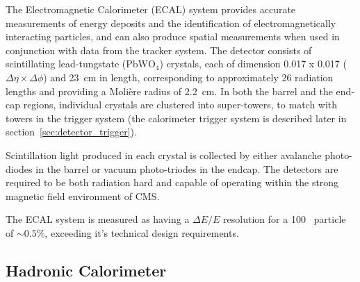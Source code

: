 

The Electromagnetic Calorimeter (ECAL) system provides accurate measurements of 
energy deposits and the identification of electromagnetically interacting 
particles, and can also produce spatial measurements when used in conjunction 
with data from the tracker system. The detector consists of scintillating
lead-tungstate
($\text{PbWO}_4$) crystals, each of dimension 0.017 x 0.017 ($\Delta \eta \times
\Delta \phi$) and 23~cm in length, corresponding to approximately 26 radiation
lengths
and providing a Moli\`{e}re radius of 2.2~cm. In both the barrel and the
end-cap regions, individual crystals are clustered into super-towers, to match
with towers in the trigger system (the calorimeter trigger system is described
later in section~\ref{sec:detector_trigger}).

Scintillation light produced in each crystal is collected by either
avalanche photo-diodes in the barrel or vacuum photo-triodes in the
endcap. The detectors are required to be both radiation hard and capable of
operating within the strong magnetic field environment of CMS.

The ECAL system is measured as having a $\Delta E/E$ resolution for a 100~\gev
particle of $\sim 0.5\%$, exceeding it's technical design requirements.

\subsection{Hadronic Calorimeter}


